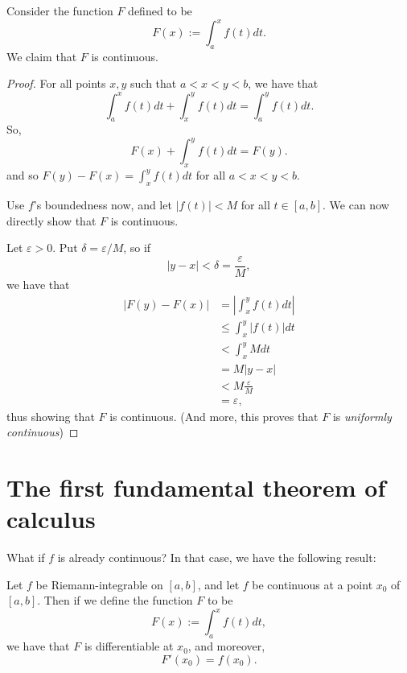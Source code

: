 \documentclass{article}
\begin{document}
Consider the function $F$ defined to be
\[
    F(x) := \int_a^x f(t)dt.
\]
We claim that $F$ is continuous. 
\begin{proof}
    For all points $x, y$ such that $a<x<y<b$, we have that
    \[
        \int_a^x f(t)dt + \int_x^y f(t)dt = \int_a^y f(t)dt.
    \]
    So,
    \[
        F(x) + \int_x^y f(t)dt = F(y).
    \]
    and so $F(y)-F(x) = \displaystyle\int_x^y f(t)dt$ for all $a < x < y < b$.

    Use $f$'s boundedness now, and let $|f(t)|<M$ for all $t \in [a,b]$. 
    We can now directly show that $F$ is continuous.

    Let $\varepsilon > 0$. Put $\delta = \varepsilon/M$, so if 
    \[
        |y - x| < \delta = \frac{\varepsilon}{M},
    \]
     we have that
     \begin{align*}
         |F(y)-F(x)| &= \left|\int_x^yf(t)dt\right| \\
                     &\leq \int_x^y |f(t)|dt \\
                     &< \int_x^y M dt \\
                     &= M|y-x| \\
                     &< M\frac{\varepsilon}{M} \\
                     &= \varepsilon,
     \end{align*}
     thus showing that $F$ is continuous. 
     (And more, this proves that $F$ is \emph{uniformly continuous})
\end{proof}

\section{The first fundamental theorem of calculus}

What if $f$ is already continuous? 
In that case, we have the following result:
\begin{theorem}
    Let $f$ be Riemann-integrable on $[a, b]$, and let $f$ be continuous at a point $x_0$ of $[a, b]$. 
    Then if we define the function $F$ to be
    \[
        F(x) := \int_a^x f(t)dt,
    \]
    we have that $F$ is differentiable at $x_0$, and moreover,
    \[
        F'(x_0) = f(x_0).
    \]
\end{theorem}
\end{document}
